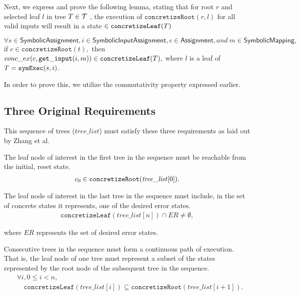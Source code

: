 Next, we express and prove the following lemma, stating that for root $r$ and selected leaf $l$ in tree $T \in \mathcal{T}$ , the execution of $\mathtt{concretizeRoot}(r,l)$ for all valid inputs will result in a state $\in \mathtt{concretizeLeaf}(T)$
\begin{lemma} \label{cop}
$\forall s \in \textsf{SymbolicAssignment}, i \in \textsf{SymbolicInputAssignment}, c \in \textsf{Assignment}, and~ m \in \textsf{SymbolicMapping},$
if $c \in \mathtt{concretizeRoot}(t),$
then 
$conc\_ex(c, \mathtt{get\_input} (i, m)) \in \mathtt{concretizeLeaf}(T),$
where $l$ is a leaf of $T =  \mathtt{symExec}(s, i)$.
\end{lemma} 

In order to prove this, we utilize the commutativity property expressed earlier.

\subsection{Three Original Requirements} This sequence of trees ($\mathit{tree\_list}$)
must satisfy these three requirements as laid out by Zhang et al.
\setcounter{property}{0}
\renewcommand{\theproperty}{Z.\arabic{property}}
\begin{property}
  \label{prop:startinit} The leaf node of interest in the first tree in the
  sequence must be reachable from the initial, reset state.
  \begin{align*}
    c_0 \in \mathtt{concretizeRoot}(\mathit{tree\_list}[0]).
  \end{align*}
\end{property}

\begin{property}
  \label{prop:enderror} The leaf node of interest in the last tree in the
  sequence must include, in the set of concrete states it represents, one of the
  desired error states. 
  \begin{align*}
    \mathtt{concretizeLeaf}(\mathit{tree\_list}[n]) \cap \mathit{ER} \neq
    \emptyset,
  \end{align*}
\end{property}
where $\mathit{ER}$ represents the set of desired error states.

\begin{property}
  \label{prop:stitch}
  Consecutive trees in the sequence must form a continuous path of
  execution. That is, the leaf node of one tree must represent a subset of the
  states represented by the root node of the subsequent tree in the sequence.
  \begin{align*}
    &\forall i, 0 \le i < n,\\
    &\quad\mathtt{concretizeLeaf}(\mathit{tree\_list}[i]) \subseteq
\mathtt{concretizeRoot}(\mathit{tree\_list}[i+1]).
\end{align*}

\end{property}

